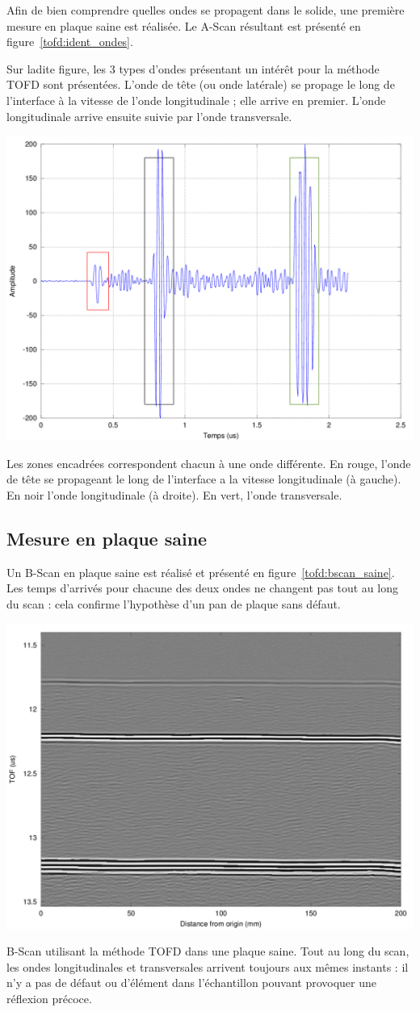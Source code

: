 Afin de bien comprendre quelles ondes se propagent dans le solide, une première mesure en plaque saine est réalisée. Le A-Scan résultant est présenté en figure~\ref{tofd:ident_ondes}.

Sur ladite figure, les 3 types d'ondes présentant un intérêt pour la méthode TOFD sont présentées.
L'onde de tête (ou onde latérale) se propage le long de l'interface à la vitesse de l'onde longitudinale ; elle arrive en premier.
L'onde longitudinale arrive ensuite suivie par l'onde transversale.

\begin{figurehere}
    \centering
    \includegraphics[width=.5\textwidth]{tofd_figs/ident_ondes.png}
    \caption{Les zones encadrées correspondent chacun à une onde différente. En rouge,
		l'onde de tête se propageant le long de l'interface a la vitesse longitudinale (à
		gauche). En noir l'onde longitudinale (à droite). En vert, l'onde transversale.}
    \label{tofd:ident_ondes}
\end{figurehere}

\subsection{Mesure en plaque saine}

Un B-Scan en plaque saine est réalisé et présenté en figure~\ref{tofd:bscan_saine}. Les temps d'arrivés pour chacune des deux ondes ne changent pas tout au long du scan : cela confirme l'hypothèse d'un pan de plaque sans défaut.

\begin{figurehere}
    \centering
    \includegraphics[width=.5\textwidth]{tofd_figs/bscan_plaque_saine.png}
    \caption{B-Scan utilisant la méthode TOFD dans une plaque saine. Tout au long du scan, les ondes longitudinales et transversales arrivent toujours aux mêmes instants : il n'y a pas de défaut ou d'élément dans l'échantillon pouvant provoquer une réflexion précoce.}
    \label{tofd:bscan_saine}
\end{figurehere}

